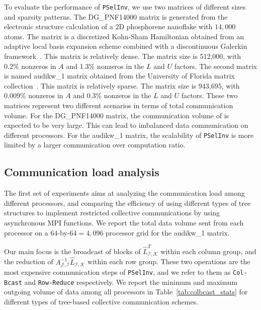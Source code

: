 \documentclass{acm_proc_article-sp}
\newcommand{\JS}{\ensuremath{\mathcal J}\xspace}
\newcommand{\IS}{\ensuremath{\mathcal I}\xspace}
\newcommand{\KS}{\ensuremath{\mathcal K}\xspace}
\newcommand{\pselinv}{\texttt{PSelInv}\xspace}
\newcommand{\colbcast}{\texttt{Col-Bcast}\xspace}
\newcommand{\rowreduce}{\texttt{Row-Reduce}\xspace}
\begin{document}
To evaluate the performance of \pselinv, we use two matrices of different 
sizes and sparsity patterns. The \linebreak DG\_PNF14000 matrix is generated
from the electronic structure calculation of a 2D phosphorene nanoflake with
$14,000$ atoms. The matrix is a discretized Kohn-Sham Hamiltonian
obtained from an adaptive local basis expansion scheme combined with a
discontinuous Galerkin framework~\cite{LinLuYingE2012}. This
matrix is relatively dense. The matrix size is 512,000,  with 0.2\% nonzeros
in $A$ and 1.3\% nonzeros in the $L$ and $U$ factors.  
The second matrix is named audikw\_1 matrix obtained from the University
of Florida matrix collection~\cite{FloridaMatrix}. This
matrix is relatively sparse. The matrix size is 943,695,
with 0.009\% nonzeros in $A$ and 0.3\% nonzeros in the $L$ and $U$ factors.  
These two matrices represent two different scenarios in terms of total communication
volume.  For the DG\_PNF14000 matrix, the communication volume of is 
expected to be very large. This can lead to imbalanced data communication 
on different processors.  For the audikw\_1 matrix, the scalability of 
\pselinv is more limited by a larger communication over computation 
ratio.  




\subsection{Communication load analysis}

The first set of experiments aims at analyzing the communication load
among different processors, and comparing the efficiency of using 
different types of
tree structures to implement restricted collective communications
by using asynchronous MPI functions. We report the total data volume sent
from each processor on a $64$-by-$64 = 4,096$ processor grid 
for the audikw\_1 matrix.

Our main focus is the broadcast of blocks of $\hat{L}^{T}_{\IS,\KS}$
within each column group, and the reduction of
$A^{-1}_{\JS,\IS}\hat{L}_{\IS,\KS}$ within each row group. 
These two operations are the most expensive communication steps
of \pselinv, and we refer to them as \colbcast and \rowreduce respectively.
We report the minimum and maximum outgoing volume of data among 
all processors in Table~\ref{tab:colbcast_stats} for different types of
tree-based collective communication schemes.
\end{document}
